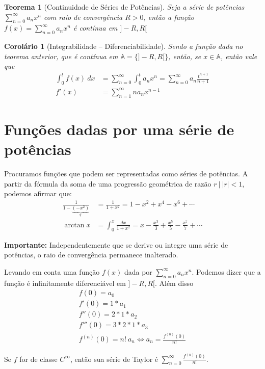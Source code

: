 \documentclass[12pt,openany, letterpaper]{book}
\newtheorem{theorem}{Teorema}[section]
\newtheorem{corollary}{Corolário}[theorem]
\newcommand{\soma}[2][n]{\sum_{{#1} = #2}^\infty}
\begin{document}
{{\begin{theorem}[Continuidade de Séries de Potências]
Seja a série de potências $\displaystyle{\soma{0} a_n x^n}$ com raio de convergência $R > 0$, então a função $f(x) = \displaystyle{\soma{0} a_n x^n}$ é contínua em $]-R,R[$
\end{theorem}

\begin{corollary}[Integrabilidade -- Diferenciabilidade]
Sendo a função dada no teorema anterior, que é contínua em $\mathds{A} = \{]-R,R[\}$, então, se $x \in \mathds{A}$, então vale que \begin{align*}
\int_0^t f(x) \ dx &= \soma{0} \int_0^t a_n x^n = \soma{0} a_n \frac{t^{n+1}}{n+1} \\
f'(x) &= \soma{1} n a_n x^{n-1}
\end{align*}
\end{corollary}

\section{Funções dadas por uma série de potências}
\hspace{5mm} Procuramos funções que podem ser representadas como séries de potências. A partir da fórmula da soma de uma progressão geométrica de razão $r \ | \ |r| < 1$, podemos afirmar que: \begin{align*}
\frac{1}{1-\underbrace{(-x^2)}_q} &= \frac{1}{1+x^2} = 1 - x^2 + x^4 - x^6 + \cdots \\
\arctan x &= \int_0^x \frac{dx}{1+x^2} = x - \frac{x^3}{3} + \frac{x^5}{5} - \frac{x^7}{7} + \cdots
\end{align*}

\textbf{Importante:} Independentemente que se derive ou integre uma série de potências, o raio de convergência permanece inalterado.

Levando em conta uma função $f(x)$ dada por $\soma{0} a_n x^n$. Podemos dizer que a função é infinitamente diferenciável em $]-R,R[$. Além disso \begin{align*}
f(0) = a_0 \\
f'(0) = 1*a_1 \\
f''(0) = 2*1*a_2 \\
f'''(0) = 3*2*1*a_3 \\
f^{(n)}(0) = n!\ a_n \Longleftrightarrow a_n = \frac{f^{(n)}(0)}{n!}
\end{align*}

Se $f$ for de classe $C^\infty$, então sua série de Taylor é $\displaystyle{\soma{0} \frac{f^{(n)} (0)}{n!}}$.

}}
\end{document}
